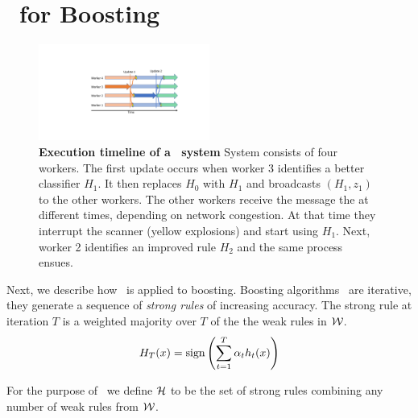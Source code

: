\section{\tmsn\ for Boosting}
\begin{figure}[t]
\begin{center}
  \includegraphics[width=0.5\textwidth]{figs/AsyncUpdates.pdf}
\end{center}
  \caption{{\bf Execution timeline of a \tmsn\ system}
      System consists of four workers. The first update occurs when
      worker 3 identifies a better classifier $H_1$. It then replaces
      $H_0$ with $H_1$ and broadcasts $(H_1,z_1)$ to the
    other workers. The other workers receive the message the at different
    times, depending on network congestion. At that time they  interrupt the
    scanner (yellow explosions) and start using $H_1$. Next, worker 2
    identifies an improved rule $H_2$ and the same process ensues.
    \label{fig:async}}
   	\vspace{0pt}
\end{figure}

Next, we describe how \tmsn\ is applied to boosting.  Boosting
algorithms~\cite{schapire_boosting:_2012} are iterative, they generate
a sequence of {\em strong rules} of increasing accuracy. The strong
rule at iteration $T$ is a weighted majority over $T$ of the the weak
rules in $\mathcal{W}$.
$$H_T(x) = \mbox{sign} \left( \sum_{t=1}^T \alpha_t h_t(x) \right)$$

For the purpose of \tmsn\ we define ${\cal H}$ to be the set of
strong rules combining any number of weak rules from $\mathcal{W}$.

